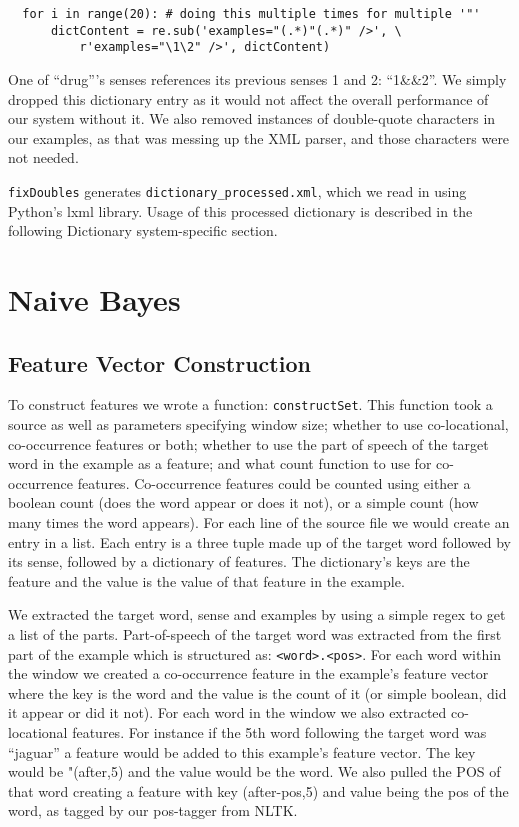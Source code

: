 \documentclass{article}
\begin{document}
\begin{verbatim}
  for i in range(20): # doing this multiple times for multiple '"'
      dictContent = re.sub('examples="(.*)"(.*)" />', \
          r'examples="\1\2" />', dictContent)
\end{verbatim}

One of ``drug'''s senses references its previous senses 1 and 2: ``1\&\&2''. We simply dropped this dictionary entry as it would not affect the overall performance of our system without it. We also removed instances of double-quote characters in our examples, as that was messing up the XML parser, and those characters were not needed.

\texttt{fixDoubles} generates \texttt{dictionary\_processed.xml}, which we read in using Python's lxml library. Usage of this processed dictionary is described in the following Dictionary system-specific section.

\section{Naive Bayes}

\subsection{Feature Vector Construction}

To construct features we wrote a function: \texttt{constructSet}. This function took a source as well as parameters specifying window size; whether to use co-locational, co-occurrence features or both; whether to use the part of speech of the target word in the example as a feature; and what count function to use for co-occurrence features. Co-occurrence features could be counted using either a boolean count (does the word appear or does it not), or a simple count (how many times the word appears). For each line of the source file we would create an entry in a list. Each entry is a three tuple made up of the target word followed by its sense, followed by a dictionary of features. The dictionary's keys are the feature and the value is the value of that feature in the example. 

We extracted the target word, sense and examples by using a simple regex to get a list of the parts. Part-of-speech of the target word was extracted from the first part of the example which is structured as: \texttt{<word>.<pos>}. For each word within the window we created a co-occurrence feature in the example's feature vector where the key is the word and the value is the count of it (or simple boolean, did it appear or did it not). For each word in the window we also extracted co-locational features. For instance if the 5th word following the target word was ``jaguar'' a feature would be added to this example's feature vector. The key would be "(after,5) and the value would be the word. We also pulled the POS of that word creating a feature with key (after-pos,5) and value being the pos of the word, as tagged by our pos-tagger from NLTK.
\end{document}
